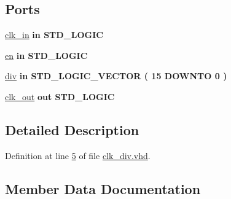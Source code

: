 \subsection*{Ports}
 \begin{DoxyCompactItemize}
\item 
\hyperlink{classclk__div_a57fad7f33f7766724bdea76e7b0330ef}{clk\+\_\+in}  {\bfseries {\bfseries \textcolor{keywordflow}{in}\textcolor{vhdlchar}{ }}} {\bfseries \textcolor{comment}{S\+T\+D\+\_\+\+L\+O\+G\+I\+C}\textcolor{vhdlchar}{ }} 
\item 
\hyperlink{classclk__div_a512588aa484615b7e90600a1bc9507b4}{en}  {\bfseries {\bfseries \textcolor{keywordflow}{in}\textcolor{vhdlchar}{ }}} {\bfseries \textcolor{comment}{S\+T\+D\+\_\+\+L\+O\+G\+I\+C}\textcolor{vhdlchar}{ }} 
\item 
\hyperlink{classclk__div_a425c2042b3ea21827b9b29c6712312d9}{div}  {\bfseries {\bfseries \textcolor{keywordflow}{in}\textcolor{vhdlchar}{ }}} {\bfseries \textcolor{comment}{S\+T\+D\+\_\+\+L\+O\+G\+I\+C\+\_\+\+V\+E\+C\+T\+O\+R}\textcolor{vhdlchar}{ }\textcolor{vhdlchar}{(}\textcolor{vhdlchar}{ }\textcolor{vhdlchar}{ } \textcolor{vhdldigit}{15} \textcolor{vhdlchar}{ }\textcolor{keywordflow}{D\+O\+W\+N\+T\+O}\textcolor{vhdlchar}{ }\textcolor{vhdlchar}{ } \textcolor{vhdldigit}{0} \textcolor{vhdlchar}{ }\textcolor{vhdlchar}{)}\textcolor{vhdlchar}{ }} 
\item 
\hyperlink{classclk__div_a8147ca5cedee84ed9753ac6f1f0b2374}{clk\+\_\+out}  {\bfseries {\bfseries \textcolor{keywordflow}{out}\textcolor{vhdlchar}{ }}} {\bfseries \textcolor{comment}{S\+T\+D\+\_\+\+L\+O\+G\+I\+C}\textcolor{vhdlchar}{ }} 
\end{DoxyCompactItemize}


\subsection{Detailed Description}


Definition at line \hyperlink{clk__div_8vhd_source_l00005}{5} of file \hyperlink{clk__div_8vhd_source}{clk\+\_\+div.\+vhd}.



\subsection{Member Data Documentation}
\hypertarget{classclk__div_a57fad7f33f7766724bdea76e7b0330ef}{}
